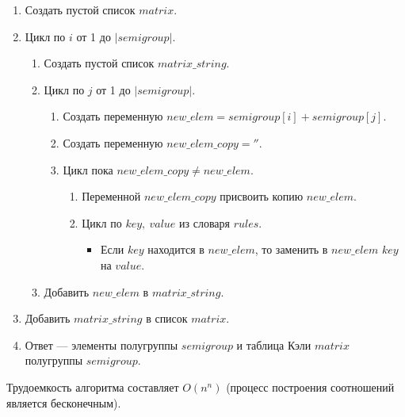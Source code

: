 \documentclass[bachelor, och, labwork]{shiza}
\begin{document}
\begin{enumerate}
    \item Создать пустой список $matrix$.
    \item Цикл по $i$ от 1 до $|semigroup|$.
        \begin{enumerate}
            \item Создать пустой список $matrix\_string$.
            \item Цикл по $j$ от 1 до $|semigroup|$.
                \begin{enumerate}
                    \item Создать переменную $new\_elem=semigroup[i]+semigroup[j]$.
                    \item Создать переменную $new\_elem\_copy=''$.
                    \item Цикл пока $new\_elem\_copy \not = new\_elem$.
                        \begin{enumerate}
                            \item Переменной $new\_elem\_copy$ присвоить копию $new\_elem$.
                            \item Цикл по $key,~value$ из словаря $rules$.
                                \begin{itemize}
                                    \item Если $key$ находится в $new\_elem$, то
                                    заменить в $new\_elem$ $key$ на $value$.
                                \end{itemize}
                        \end{enumerate}
             
                \end{enumerate}
            \item Добавить $new\_elem$ в $matrix\_string$.
        \end{enumerate}
        \item Добавить $matrix\_string$ в список $matrix$.
    \item Ответ --- элементы полугруппы $semigroup$ и таблица Кэли $matrix$ 
    полугруппы $semigroup$.
\end{enumerate}

Трудоемкость алгоритма составляет $O(n^n)$ (процесс построения соотношений 
является бесконечным).



\nopagebreak
\end{document}

